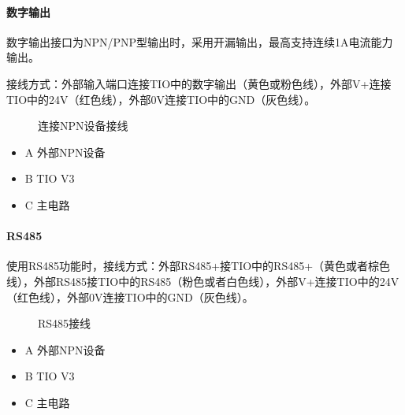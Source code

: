 \documentclass[a4paper,11pt,english,openany,oneside]{sphinxmanual}
\begin{document}
\paragraph{数字输出}
\label{\detokenize{08 _u5b89_u88c5_u4e0e_u8c03_u8bd5:id39}}\label{\detokenize{08 _u5b89_u88c5_u4e0e_u8c03_u8bd5:id40}}
\sphinxAtStartPar
数字输出接口为NPN/PNP型输出时，采用开漏输出，最高支持连续1A电流能力输出。

\sphinxAtStartPar
接线方式：外部输入端口连接TIO中的数字输出（黄色或粉色线），外部V+连接TIO中的24V（红色线），外部0V连接TIO中的GND（灰色线）。

\begin{figure}[H]
\centering
\capstart

\noindent{}
\caption{连接NPN设备接线}\label{\detokenize{08 _u5b89_u88c5_u4e0e_u8c03_u8bd5:id103}}\end{figure}


\begin{itemize}
\item {} 
\sphinxAtStartPar
A 外部NPN设备

\item {} 
\sphinxAtStartPar
B TIO V3

\item {} 
\sphinxAtStartPar
C 主电路

\end{itemize}


\paragraph{RS485}
\label{\detokenize{08 _u5b89_u88c5_u4e0e_u8c03_u8bd5:rs485}}\label{\detokenize{08 _u5b89_u88c5_u4e0e_u8c03_u8bd5:id41}}
\sphinxAtStartPar
使用RS485功能时，接线方式：外部RS485+接TIO中的RS485+（黄色或者棕色线），外部RS485\sphinxhyphen{}接TIO中的RS485\sphinxhyphen{}（粉色或者白色线），外部V+连接TIO中的24V（红色线），外部0V连接TIO中的GND（灰色线）。

\begin{figure}[H]
\centering
\capstart

\noindent{}
\caption{RS485接线}\label{\detokenize{08 _u5b89_u88c5_u4e0e_u8c03_u8bd5:id104}}\end{figure}


\begin{itemize}
\item {} 
\sphinxAtStartPar
A 外部NPN设备

\item {} 
\sphinxAtStartPar
B TIO V3

\item {} 
\sphinxAtStartPar
C 主电路

\end{itemize}
\end{document}
